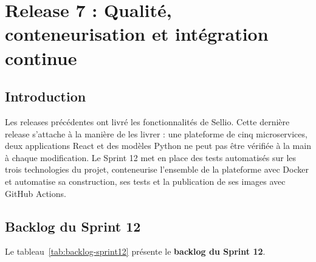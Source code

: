\thispagestyle{fancy}
\chapter{Release 7 : Qualité, conteneurisation et intégration continue}
\section*{Introduction}
Les releases précédentes ont livré les fonctionnalités de Sellio. Cette dernière release s'attache à la manière de les livrer : une plateforme de cinq microservices, deux applications React et des modèles Python ne peut pas être vérifiée à la main à chaque modification. Le Sprint 12 met en place des tests automatisés sur les trois technologies du projet, conteneurise l'ensemble de la plateforme avec Docker et automatise sa construction, ses tests et la publication de ses images avec GitHub Actions.

\section{Backlog du Sprint 12}
Le tableau~\ref{tab:backlog-sprint12} présente le \textbf{backlog du Sprint 12}.

